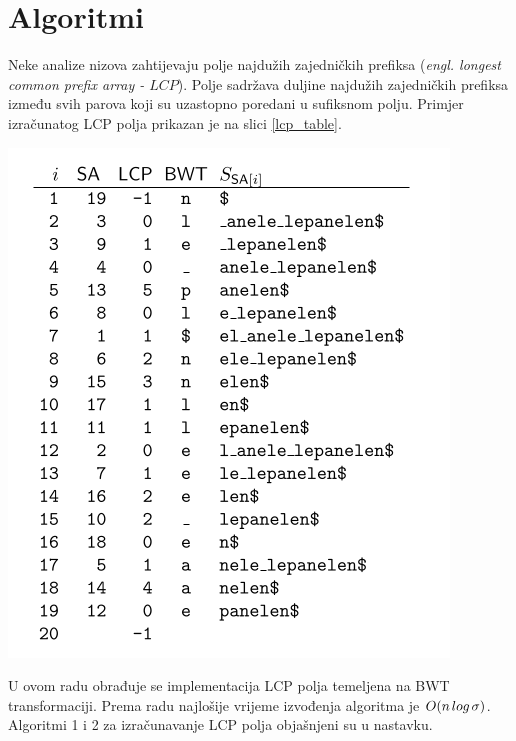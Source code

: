 \documentclass[times, utf8, seminar, numeric]{fer}
\begin{document}
\section{Algoritmi}

Neke analize nizova zahtijevaju polje najdužih zajedničkih prefiksa (\textit{engl. longest common prefix array - $LCP$}). Polje sadržava duljine najdužih zajedničkih prefiksa između svih parova koji su uzastopno poredani u sufiksnom polju. Primjer izračunatog LCP polja prikazan je na slici \ref{lcp_table}.

\begin{center}
	\includegraphics[scale=0.5]{slike/lcp_table_2.png}
	\label{lcp_table}
\end{center}


U ovom radu obrađuje se implementacija LCP polja temeljena na BWT transformaciji. Prema radu\cite{Beller2011} najlošije vrijeme izvođenja algoritma je $ O(n\hspace{0.5mm} log \hspace{0.5mm} \sigma) $. Algoritmi 1 i 2 za  izračunavanje LCP polja objašnjeni su u nastavku.
\end{document}
